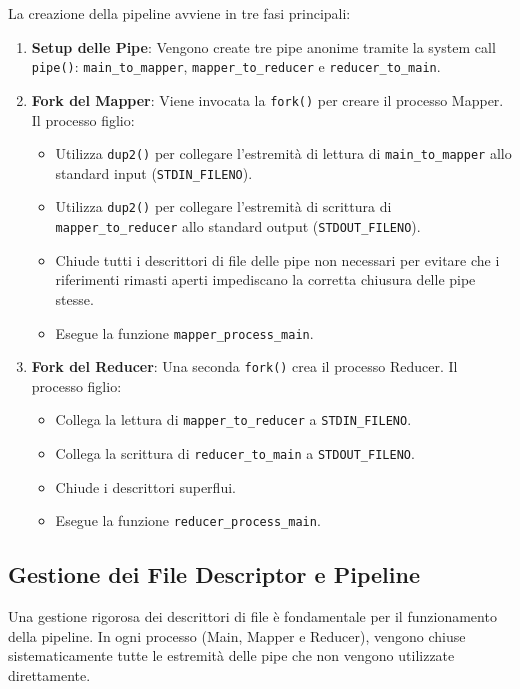 \documentclass[12pt,a4paper]{article}
\begin{document}
La creazione della pipeline avviene in tre fasi principali:
\begin{enumerate}
    \item \textbf{Setup delle Pipe}: Vengono create tre pipe anonime tramite la system call \texttt{pipe()}: \texttt{main\_to\_mapper}, \texttt{mapper\_to\_reducer} e \texttt{reducer\_to\_main}.
    \item \textbf{Fork del Mapper}: Viene invocata la \texttt{fork()} per creare il processo Mapper. Il processo figlio:
    \begin{itemize}
        \item Utilizza \texttt{dup2()} per collegare l'estremità di lettura di \texttt{main\_to\_mapper} allo standard input (\texttt{STDIN\_FILENO}).
        \item Utilizza \texttt{dup2()} per collegare l'estremità di scrittura di \texttt{mapper\_to\_reducer} allo standard output (\texttt{STDOUT\_FILENO}).
        \item Chiude tutti i descrittori di file delle pipe non necessari per evitare che i riferimenti rimasti aperti impediscano la corretta chiusura delle pipe stesse.
        \item Esegue la funzione \texttt{mapper\_process\_main}.
    \end{itemize}
    \item \textbf{Fork del Reducer}: Una seconda \texttt{fork()} crea il processo Reducer. Il processo figlio:
    \begin{itemize}
        \item Collega la lettura di \texttt{mapper\_to\_reducer} a \texttt{STDIN\_FILENO}.
        \item Collega la scrittura di \texttt{reducer\_to\_main} a \texttt{STDOUT\_FILENO}.
        \item Chiude i descrittori superflui.
        \item Esegue la funzione \texttt{reducer\_process\_main}.
    \end{itemize}
\end{enumerate}

\subsection{Gestione dei File Descriptor e Pipeline}
Una gestione rigorosa dei descrittori di file è fondamentale per il funzionamento della pipeline. In ogni processo (Main, Mapper e Reducer), vengono chiuse sistematicamente tutte le estremità delle pipe che non vengono utilizzate direttamente. 
\end{document}
